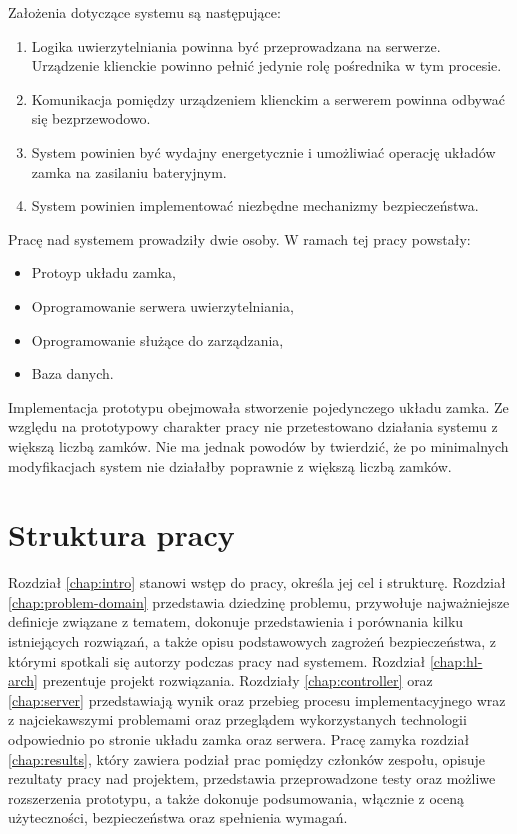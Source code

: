		Założenia dotyczące systemu są następujące:

		\begin{enumerate}
		    \item Logika uwierzytelniania powinna być przeprowadzana na serwerze. Urządzenie klienckie powinno pełnić jedynie rolę pośrednika w tym procesie.
		    \item Komunikacja pomiędzy urządzeniem klienckim a serwerem powinna odbywać się bezprzewodowo.
		    \item System powinien być wydajny energetycznie i umożliwiać operację układów zamka na zasilaniu bateryjnym.
		    \item System powinien implementować niezbędne mechanizmy bezpieczeństwa.
		\end{enumerate}

		Pracę nad systemem prowadziły dwie osoby. W ramach tej pracy powstały:

		\begin{itemize}
		    \item Protoyp układu zamka,
		    \item Oprogramowanie serwera uwierzytelniania,
		    \item Oprogramowanie służące do zarządzania,
		    \item Baza danych.
		\end{itemize}

		Implementacja prototypu obejmowała stworzenie pojedynczego układu zamka. Ze względu na prototypowy charakter pracy nie przetestowano działania systemu z większą liczbą zamków. Nie ma jednak powodów by twierdzić, że po minimalnych modyfikacjach system nie działałby poprawnie z większą liczbą zamków.


	\section{Struktura pracy}

		Rozdział \ref{chap:intro} stanowi wstęp do pracy, określa jej cel i strukturę. Rozdział \ref{chap:problem-domain} przedstawia dziedzinę problemu, przywołuje najważniejsze definicje związane z tematem, dokonuje przedstawienia i porównania kilku istniejących rozwiązań, a także opisu podstawowych zagrożeń bezpieczeństwa, z którymi spotkali się autorzy podczas pracy nad systemem. Rozdział \ref{chap:hl-arch} prezentuje projekt rozwiązania. Rozdziały \ref{chap:controller} oraz \ref{chap:server} przedstawiają wynik oraz przebieg procesu implementacyjnego wraz z najciekawszymi problemami oraz przeglądem wykorzystanych technologii odpowiednio po stronie układu zamka oraz serwera. Pracę zamyka rozdział \ref{chap:results}, który zawiera podział prac pomiędzy członków zespołu, opisuje rezultaty pracy nad projektem, przedstawia przeprowadzone testy oraz możliwe rozszerzenia prototypu, a także dokonuje podsumowania, włącznie z oceną użyteczności, bezpieczeństwa oraz spełnienia wymagań. 